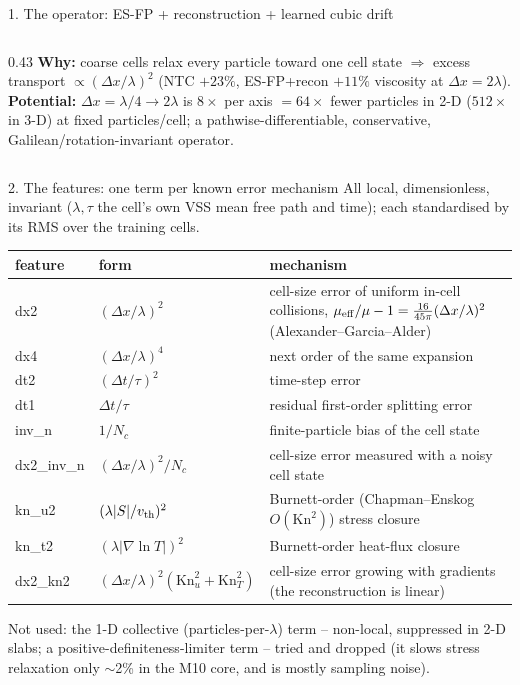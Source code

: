 \documentclass[10pt,aspectratio=169]{beamer}
\begin{document}
\begin{frame}{1. The operator: ES-FP + reconstruction + learned cubic drift}
\begin{columns}[T]
\begin{column}{0.43\textwidth}
\medskip
\textbf{Why:} coarse cells relax every particle toward one cell state
$\Rightarrow$ excess transport $\propto(\Delta x/\lambda)^2$
(NTC $+23\%$, ES-FP+recon $+11\%$ viscosity at $\Delta x=2\lambda$).
\textbf{Potential:} $\Delta x=\lambda/4\to2\lambda$ is $8\times$ per axis $=64\times$ fewer
particles in 2-D ($512\times$ in 3-D) at fixed particles/cell; a pathwise-differentiable,
conservative, Galilean/rotation-invariant operator.
\end{column}
\end{columns}
\end{frame}

\begin{frame}{2. The features: one term per known error mechanism}
\small
All local, dimensionless, invariant ($\lambda,\tau$ the cell's own VSS mean free path and time);
each standardised by its RMS over the training cells.
\begin{center}
\footnotesize
\renewcommand{\arraystretch}{1.12}
\begin{tabular}{@{}llp{}@{}}
\toprule
feature & form & mechanism \\ \midrule
dx2 & $(\Delta x/\lambda)^2$ & cell-size error of uniform in-cell collisions,
  $\mu_{\rm eff}/\mu-1=\tfrac{16}{45\pi}(\Delta x/\lambda)^2$ (Alexander--Garcia--Alder) \\
dx4 & $(\Delta x/\lambda)^4$ & next order of the same expansion \\
dt2 & $(\Delta t/\tau)^2$ & time-step error \\
dt1 & $\Delta t/\tau$ & residual first-order splitting error \\
inv\_n & $1/N_c$ & finite-particle bias of the cell state \\
dx2\_inv\_n & $(\Delta x/\lambda)^2/N_c$ & cell-size error measured with a noisy cell state \\
kn\_u2 & $(\lambda|S|/v_{\rm th})^2$ & Burnett-order (Chapman--Enskog $O(\mathrm{Kn}^2)$) stress
  closure \\
kn\_t2 & $(\lambda|\nabla\ln T|)^2$ & Burnett-order heat-flux closure \\
dx2\_kn2 & $(\Delta x/\lambda)^2(\mathrm{Kn}_u^2+\mathrm{Kn}_T^2)$ & cell-size error growing
  with gradients (the reconstruction is linear) \\
\bottomrule
\end{tabular}
\end{center}
\vspace{2pt}
\footnotesize
Not used: the 1-D collective (particles-per-$\lambda$) term -- non-local, suppressed in 2-D slabs;
a positive-definiteness-limiter term -- tried and dropped (it slows stress relaxation only
$\sim$2\% in the M10 core, and is mostly sampling noise).
\end{frame}
\end{document}
